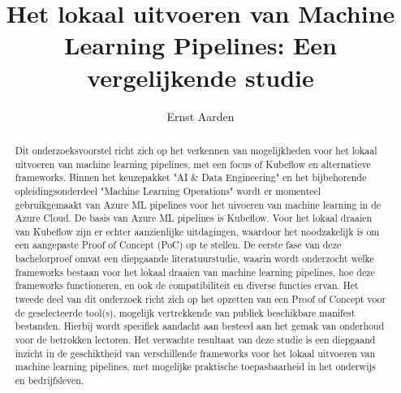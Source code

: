 \documentclass{hogent-article}
\title{Het lokaal uitvoeren van Machine Learning Pipelines: Een vergelijkende studie}
\author{Ernst Aarden}
\begin{document}
\begin{abstract}
  Dit onderzoeksvoorstel richt zich op het verkennen van mogelijkheden voor het lokaal uitvoeren van machine learning pipelines, met een focus of Kubeflow en alternatieve frameworks.
  Binnen het keuzepakket "AI & Data Engineering" en het bijbehorende opleidingsonderdeel "Machine Learning Operations" wordt er momenteel gebruikgemaakt van Azure ML pipelines voor het uivoeren van machine learning in de Azure Cloud.
  De basis van Azure ML pipelines is Kubeflow. Voor het lokaal draaien van Kubeflow zijn er echter aanzienlijke uitdagingen, waardoor het noodzakelijk is om een aangepaste Proof of Concept (PoC) op te stellen.
  De eerste fase van deze bachelorproef omvat een diepgaande literatuurstudie, waarin wordt onderzocht welke frameworks bestaan voor het lokaal draaien van machine learning pipelines, hoe deze frameworks functioneren, en ook de compatibiliteit en diverse functies ervan.
  Het tweede deel van dit onderzoek richt zich op het opzetten van een Proof of Concept voor de geselecteerde tool(s), mogelijk vertrekkende van publiek beschikbare manifest bestanden. Hierbij wordt specifiek aandacht aan besteed aan het gemak van onderhoud voor de betrokken lectoren.
  Het verwachte resultaat van deze studie is een diepgaand inzicht in de geschiktheid van verschillende frameworks voor het lokaal uitvoeren van machine learning pipelines, met mogelijke praktische toepasbaarheid in het onderwijs en bedrijfsleven.
\end{abstract}

\tableofcontents



\printbibliography[heading=bibintoc]
\end{document}
